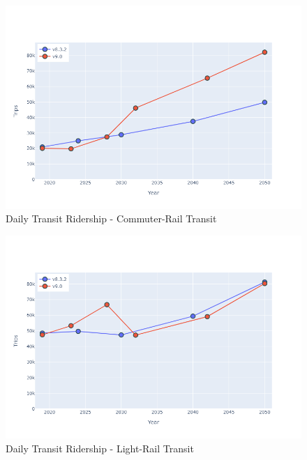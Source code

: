 \documentclass[
  letterpaper,
  DIV=11,
  numbers=noendperiod,
  titlepage=false]{scrreprt}
\begin{document}
\begin{figure}[H]

{\centering \includegraphics{v9x/v900/whats-new/_pictures/pdf-hy-tr-crt.png}

}

\caption{\label{fig-pdf-hy-tr-crt}Daily Transit Ridership -
Commuter-Rail Transit}

\end{figure}

\begin{figure}[H]

{\centering \includegraphics{v9x/v900/whats-new/_pictures/pdf-hy-tr-lrt.png}

}

\caption{\label{fig-pdf-hy-tr-lrt}Daily Transit Ridership - Light-Rail
Transit}

\end{figure}
\end{document}
